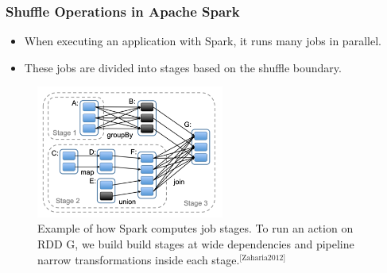 \documentclass{beamer}
\begin{document}
\begin{frame}
  \frametitle{Shuffle Operations in Apache Spark}
  \begin{itemize}
  \item When executing an application with Spark, it runs many jobs in parallel.
  \item These jobs are divided into stages based on the shuffle boundary.
  \end{itemize}
  \begin{figure}[!b]
    \centering 
    \includegraphics[width=0.55\textwidth]{shuffle-phase-in-spark}
    \caption{Example of how Spark computes job stages. To run an action on RDD
      G, we build build stages at wide dependencies and pipeline narrow
      transformations inside each stage.$^{\text{[Zaharia2012]}}$}
    \label{fig:shuffle-phase-in-spark}
  \end{figure}
\end{frame}

\end{document}
